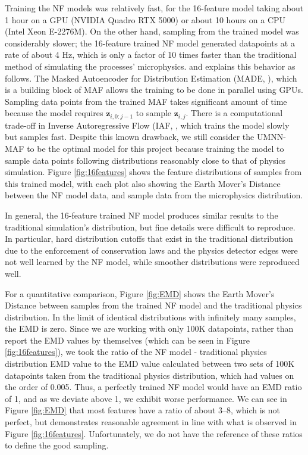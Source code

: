 Training the NF models was relatively fast, for the 16-feature model taking about 1 hour on a GPU (NVIDIA Quadro RTX 5000) or about 10 hours on a CPU (Intel Xeon E-2276M). On the other hand, sampling from the trained model was considerably slower; the 16-feature trained NF model generated datapoints at a rate of about 4 Hz, which is only a factor of 10 times faster than the traditional method of simulating the processes' microphysics. \cite{Wehenkel2019UnconstrainedNetworks} and \cite{Papamakarios2017MaskedEstimation} explains this behavior as follows. The Masked Autoencoder for Distribution Estimation (MADE, \cite{Germain2015MADE:Estimation}), which is a building block of MAF allows the training to be done in parallel using GPUs. Sampling data points from the trained MAF takes significant amount of time because the model requires $\mathbf{z}_{i,0:j-1}$ to sample $\mathbf{z}_{i,j}$. There is a computational trade-off in Inverse Autoregressive Flow (IAF, \cite{Kingma2016ImprovingFlow}, which trains the model slowly but samples fast. Despite this known drawback, we still consider the UMNN-MAF to be the optimal model for this project because training the model to sample data points following distributions reasonably close to that of physics simulation. Figure \ref{fig:16features} shows the feature distributions of samples from this trained model, with each plot also showing the Earth Mover's Distance between the NF model data, and sample data from the microphysics distribution.


In general, the 16-feature trained NF model produces similar results to the traditional simulation's distribution, but fine details were difficult to reproduce. In particular, hard distribution cutoffs that exist in the traditional distribution due to the enforcement of conservation laws and the physics detector edges were not well learned by the NF model, while smoother distributions were reproduced well.

For a quantitative comparison, Figure \ref{fig:EMD} shows the Earth Mover's Distance between samples from the trained NF model and the traditional physics distribution. In the limit of identical distributions with infinitely many samples, the EMD is zero. Since we are working with only 100K datapoints, rather than report the EMD values by themselves (which can be seen in Figure \ref{fig:16features}), we took the ratio of the NF model - traditional physics distribution EMD value to the EMD value calculated between two sets of 100K datapoints taken from the traditional physics distribution, which had values on the order of 0.005. Thus, a perfectly trained NF model would have an EMD ratio of 1, and as we deviate above 1, we exhibit worse performance. We can see in Figure \ref{fig:EMD} that most features have a ratio of about 3--8, which is not perfect, but demonstrates reasonable agreement in line with what is observed in Figure \ref{fig:16features}. Unfortunately, we do not have the reference of these ratios to define the good sampling.

